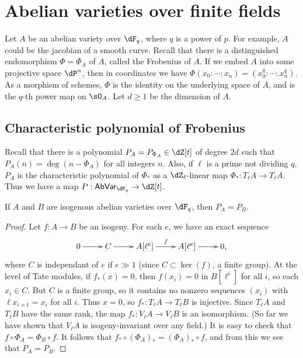 \documentclass{article}
\begin{document}
\section{Abelian varieties over finite fields}

Let $A$ be an abelian variety over $\dF_q$, where $q$ is a power of $p$. For 
example, $A$ could be the jacobian of a smooth curve. Recall that there is a 
distinguished endomorphism $\Phi=\Phi_A$ of $A$, called the Frobenius of $A$. 
If we embed $A$ into some projective space $\dP^n$, then in coordinates we 
have $\Phi(x_0:\cdots:x_n) = (x_0^q:\cdots:x_n^q)$. As a morphism of schemes, 
$\Phi$ is the identity on the underlying space of $A$, and is the $q$-th power 
map on $\sO_A$. Let $d\geqslant 1$ be the dimension of $A$. 


\subsection*{Characteristic polynomial of Frobenius}

Recall that there is a polynomial $P_A=P_{\Phi_A}\in \dZ[t]$ of degree $2 d$ 
such that $P_A(n)=\deg(n-\Phi_A)$ for all integers $n$. Also, if $\ell$ is a 
prime not dividing $q$, $P_A$ is the characteristic polynomial of $\Phi_\ast$ 
as a $\dZ_\ell$-linear map $\Phi_\ast:T_\ell A\to T_\ell A$. Thus we have a 
map $P:\mathsf{AbVar}_{\dF_q} \to \dZ[t]$. 

\begin{theorem}
If $A$ and $B$ are isogenous abelian varieties over $\dF_q$, then 
$P_A=P_B$.
\end{theorem}
\begin{proof}
Let $f:A\to B$ be an isogeny. For each $e$, we have an exact sequence 
\[\xymatrix{
  0 \ar[r] 
    & C \ar[r] 
    & A[\ell^e] \ar[r]^-f 
    & A[\ell^e] \ar[r]
    & 0\text{,}
}\]
where $C$ is independant of $e$ if $e\gg 1$ (since $C\subset \ker(f)$, a finite 
group). At the level of Tate modules, if $f_\ast(x)=0$, then 
$f(x_i)=0$ in $B[\ell^i]$ for all $i$, so each $x_i\in C$. But $C$ is a finite 
group, so it contains no nonzero sequences $(x_i)$ with $\ell x_{i+1}=x_i$ for 
all $i$. Thus $x=0$, so $f_\ast:T_\ell A\to T_\ell B$ is injective. Since 
$T_\ell A$ and $T_\ell B$ have the same rank, the map 
$f_\ast:V_\ell A\to V_\ell B$ is an isomorphism. (So far we have shown that 
$V_\ell A$ is isogeny-invariant over any field.) It is easy to check that 
$f\circ \Phi_A=\Phi_B\circ f$. It follows that 
$f_\ast\circ (\Phi_A)_\ast = (\Phi_A)_\ast \circ f$, and from this we see that 
$P_A=P_B$. 
\end{proof}
\end{document}
